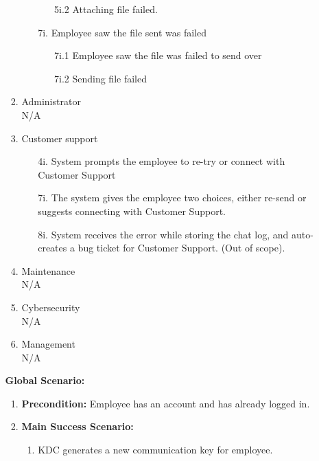 \documentclass[]{article}
\begin{document}
\begin{enumerate}[{\bf BE1.}]
\begin{enumerate}[{\bf BE7.}]
\begin{enumerate}[{\bf VP1.}]
\begin{enumerate}
\begin{enumerate}
                        \item[5i.2] Attaching file failed.
                    \end{enumerate}
                    \item[7i.] Employee saw the file sent was failed
                    \begin{enumerate}
                        \item[7i.1] Employee saw the file was failed to send over
                        \item[7i.2] Sending file failed
                    \end{enumerate}
                \end{enumerate}
		  \item Administrator \\
				N/A
            \item Customer support \\
            \begin{enumerate}
                \item[4i.] System prompts the employee to re-try or connect with Customer Support 
                \item[7i.] The system gives the employee two choices, either re-send or suggests connecting with Customer Support. 
                \item[8i.] System receives the error while storing the chat log, and auto-creates a bug ticket for Customer Support. (Out of scope). 
            \end{enumerate}
            \item Maintenance \\
            N/A
            \item Cybersecurity \\
            N/A
            \item Management \\
            N/A \\
		\end{enumerate}
		{\bf Global Scenario:}\\
        \begin{enumerate}[{  }]
            \item \textbf{Precondition:} Employee has an account and has already logged in.
            \item \textbf{Main Success Scenario:}
            \begin{enumerate}[{  1.}]
                    \item KDC generates a new communication key for employee.

\end{enumerate}
\end{enumerate}
\end{enumerate}
\end{enumerate}
\end{document}
